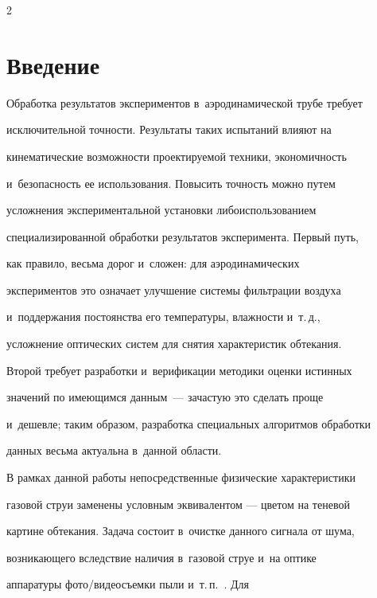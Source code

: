 \begin{multicols}{2}



\label{st\stat}





\section{Введение}



Обработка результатов экспериментов в~аэродинамической трубе требует

исключительной точ\-ности. Результаты таких испытаний влияют на

кинематические возможности проектируемой техники, экономичность 

и~безопасность ее использования. Повысить точность можно путем

услож\-не\-ния экспериментальной установки либо\linebreak использованием

специализированной обработки результатов эксперимента. Первый путь,

как правило, весьма дорог и~сложен: для аэродинамических

экспериментов это означает улучшение системы фильтрации воздуха 

и~поддержания постоянства его температуры, влажности и~т.\,д.,

усложнение оптических систем для снятия характеристик обтекания.

Второй требует разработки и~верификации методики оценки истинных

значений по имеющимся данным~--- зачастую это сделать проще 

и~дешевле; таким образом, разработка специальных алгоритмов обработки

данных весьма актуальна в~данной области.



В рамках данной работы непосредственные физические характеристики

газовой струи заменены условным эквивалентом --- цветом на теневой

картине обтекания. Задача состоит в~очистке данного сигнала от шума,

возникающего вследствие наличия в~газовой струе и~на оптике

аппаратуры фото/видеосъемки пыли и~т.\,п.~\cite{holder, krasnov}. Для


\end{multicols}

